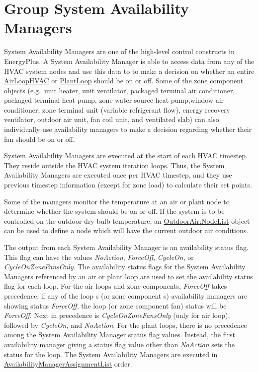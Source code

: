 \section{Group System Availability Managers}\label{group-system-availability-managers}

System Availability Managers are one of the high-level control constructs in EnergyPlus. A System Availability Manager is able to access data from any of the HVAC system nodes and use this data to to make a decision on whether an entire \hyperref[airloophvac]{AirLoopHVAC} or \hyperref[plantloop]{PlantLoop} should be on or off. Some of the zone component objects (e.g.~unit heater, unit ventilator, packaged terminal air conditioner, packaged terminal heat pump, zone water source heat pump,window air conditioner, zone terminal unit (variable refrigerant flow), energy recovery ventilator, outdoor air unit, fan coil unit, and ventilated slab) can also individually use availability managers to make a decision regarding whether their fan should be on or off.

System Availability Managers are executed at the start of each HVAC timestep. They reside outside the HVAC system iteration loops. Thus, the System Availability Managers are executed once per HVAC timestep, and they use previous timestep information (except for zone load) to calculate their set points.

Some of the managers monitor the temperature at an air or plant node to determine whether the system should be on or off. If the system is to be controlled on the outdoor dry-bulb temperature, an \hyperref[outdoorairnodelist]{OutdoorAir:NodeList} object can be used to define a node which will have the current outdoor air conditions.

The output from each System Availability Manager is an availability status flag. This flag can have the values \emph{NoAction}, \emph{ForceOff}, \emph{CycleOn}, or \emph{CycleOnZoneFansOnly}. The availability status flags for the System Availability Managers referenced by an air or plant loop are used to set the availability status flag for each loop. For the air loops and zone components, \emph{ForceOff} takes precedence: if any of the loop s (or zone component s) availability managers are showing status \emph{ForceOff}, the loop (or zone component fan) status will be \emph{ForceOff}. Next in precedence is \emph{CycleOnZoneFansOnly} (only for air loop), followed by \emph{CycleOn,} and \emph{NoAction}. For the plant loops, there is no precedence among the System Availability Manager status flag values. Instead, the first availability manager giving a status flag value other than \emph{NoAction} sets the status for the loop. The System Availability Managers are executed in \hyperref[availabilitymanagerassignmentlist]{AvailabilityManagerAssignmentList} order.

